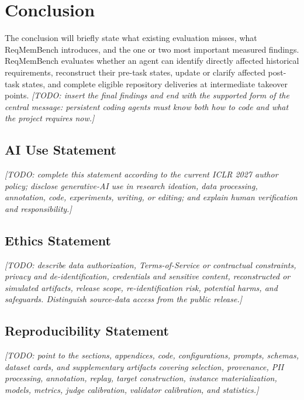 \documentclass{article} %
\newcommand{\placeholder}[1]{\emph{[#1]}}
\begin{document}
\section{Conclusion}
\label{sec:conclusion}

The conclusion will briefly state what existing evaluation misses, what ReqMemBench introduces, and the one or two most important measured findings. ReqMemBench evaluates whether an agent can identify directly affected historical requirements, reconstruct their pre-task states, update or clarify affected post-task states, and complete eligible repository deliveries at intermediate takeover points.
\placeholder{TODO: insert the final findings and end with the supported form of the central message: persistent coding agents must know both how to code and what the project requires now.}

\subsection*{AI Use Statement}

\placeholder{TODO: complete this statement according to the current ICLR 2027 author policy; disclose generative-AI use in research ideation, data processing, annotation, code, experiments, writing, or editing; and explain human verification and responsibility.}

\subsection*{Ethics Statement}

\placeholder{TODO: describe data authorization, Terms-of-Service or contractual constraints, privacy and de-identification, credentials and sensitive content, reconstructed or simulated artifacts, release scope, re-identification risk, potential harms, and safeguards. Distinguish source-data access from the public release.}

\subsection*{Reproducibility Statement}

\placeholder{TODO: point to the sections, appendices, code, configurations, prompts, schemas, dataset cards, and supplementary artifacts covering selection, provenance, PII processing, annotation, replay, target construction, instance materialization, models, metrics, judge calibration, validator calibration, and statistics.}
\end{document}
